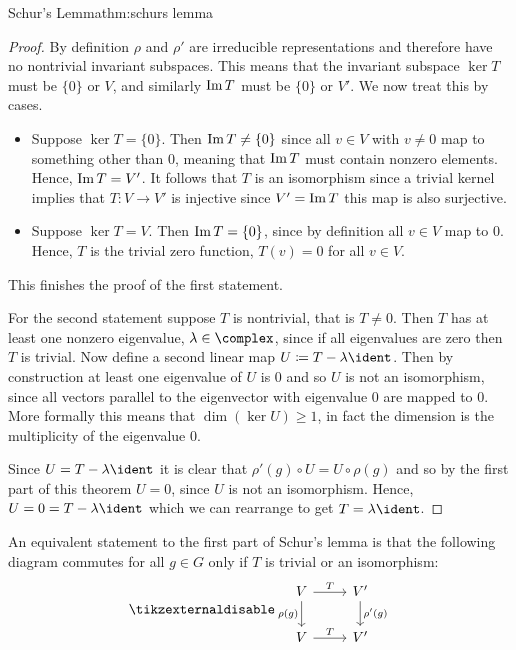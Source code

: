 \begin{thm}{Schur's Lemma}{thm:schurs lemma}
\begin{proof}
        By definition \(\rho\) and \(\rho'\) are irreducible representations
        and therefore have no nontrivial invariant subspaces.
        This means that the invariant subspace \(\ker T\) must be \(\{0\}\)
        or \(V\), and similarly \(\operatorname{Im} T\) must be \(\{0\}\) or \(V'\).
        We now treat this by cases.
        \begin{itemize}
            \item Suppose \(\ker T = \{0\}\).
            Then \(\operatorname{Im} T \ne \{0\}\) since all \(v \in V\) with \(v \ne
            0\) map to something other than \(0\), meaning that \(\operatorname{Im} T\) must contain
            nonzero elements.
            Hence, \(\operatorname{Im} T = V'\).
            It follows that \(T\) is an isomorphism since a trivial kernel
            implies that \(T \colon V \to V'\) is injective since \(V' = \operatorname{Im} T\) this map
            is also surjective.
            \item Suppose \(\ker T = V\).
            Then \(\operatorname{Im} T = \{0\}\), since by definition all \(v \in V\)
            map to \(0\).
            Hence, \(T\) is the trivial zero function, \(T(v) = 0\) for all
            \(v \in V\).
        \end{itemize}
        This finishes the proof of the first statement.
        
        For the second statement suppose \(T\) is nontrivial, that is \(T
        \ne 0\).
        Then \(T\) has at least one nonzero eigenvalue, \(\lambda \in
        \complex\), since if all eigenvalues are zero then \(T\) is trivial.
        Now define a second linear map \(U \coloneqq T - \lambda\ident\).
        Then by construction at least one eigenvalue of \(U\) is 0 and so
        \(U\) is not an isomorphism, since all vectors parallel to the eigenvector with
        eigenvalue 0 are mapped to 0.
        More formally this means that \(\dim(\ker U) \ge 1\), in fact the
        dimension is the multiplicity of the eigenvalue 0.
        
        Since \(U = T - \lambda \ident\) it is clear that \(\rho'(g) \circ U
        = U \circ \rho(g)\) and so by the first part of this theorem \(U = 0\), since
        \(U\) is not an isomorphism.
        Hence, \(U = 0 = T - \lambda \ident\) which we can rearrange to get
        \(T = \lambda \ident\).
    \end{proof}
\end{thm}

An equivalent statement to the first part of Schur's lemma is that the
following diagram commutes for all \(g \in G\) only if \(T\) is trivial or an
isomorphism:
\begin{equation}
    \tikzexternaldisable
    \begin{tikzcd}
        V \ar[r, "T"]\ar[d, "\rho(g)"'] & V' \ar[d, "\rho'(g)"]\\
        V \ar[r, "T"]& V'
    \end{tikzcd}
\end{equation}

